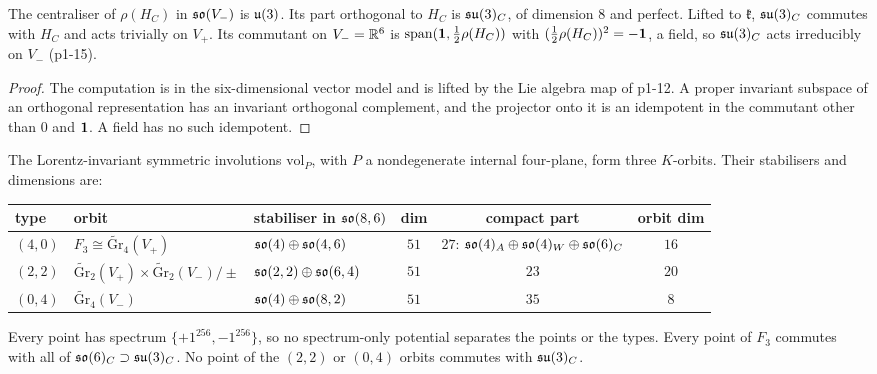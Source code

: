 \begin{lemma}
\label{p1:lem:colour}
The centraliser of $\rho(H_C)$ in $\mathfrak{so}(V_-)$ is $\mathfrak{u}(3)$. Its part orthogonal to $H_C$ is $\mathfrak{su}(3)_C$, of dimension $8$ and perfect. Lifted to $\mathfrak k$, $\mathfrak{su}(3)_C$ commutes
with $H_C$ and acts trivially on $V_+$. Its commutant on $V_-=\mathbb{R}^6$ is $\operatorname{span}(\mathbf 1,\tfrac12\rho(H_C))$ with $(\tfrac12\rho(H_C))^2=-\mathbf 1$, a field, so
$\mathfrak{su}(3)_C$ acts irreducibly on $V_-$ (p1-15).
\end{lemma}

\begin{proof}
The computation is in the six-dimensional vector model and is lifted by the Lie algebra map of p1-12. A proper invariant subspace of an orthogonal representation
has an invariant orthogonal complement, and the projector onto it is an idempotent in the commutant other than $0$ and $\mathbf 1$. A field has no such idempotent.
\end{proof}

\begin{theorem}
\label{p1:thm:classify}
The Lorentz-invariant symmetric involutions $\mathrm{vol}_P$, with $P$ a nondegenerate internal four-plane, form three $K$-orbits. Their stabilisers and dimensions are:
\begin{center}
\footnotesize
\begin{tabular}{@{}lllccc@{}}
\toprule
type & orbit & stabiliser in $\mathfrak{so}(8,6)$ & dim & compact part & orbit dim\\
\midrule
$(4,0)$ & $F_3\cong\widetilde{\mathrm{Gr}}_4(V_+)$ & $\mathfrak{so}(4)\oplus\mathfrak{so}(4,6)$ & $51$ & $27$: $\mathfrak{so}(4)_A\oplus\mathfrak{so}(4)_W\oplus\mathfrak{so}(6)_C$ & $16$\\
$(2,2)$ & $\widetilde{\mathrm{Gr}}_2(V_+)\times\widetilde{\mathrm{Gr}}_2(V_-)/\pm$ & $\mathfrak{so}(2,2)\oplus\mathfrak{so}(6,4)$ & $51$ & $23$ & $20$\\
$(0,4)$ & $\widetilde{\mathrm{Gr}}_4(V_-)$ & $\mathfrak{so}(4)\oplus\mathfrak{so}(8,2)$ & $51$ & $35$ & $8$\\
\bottomrule
\end{tabular}
\end{center}
Every point has spectrum $\{+1^{256},-1^{256}\}$, so no spectrum-only potential separates the points or the types. Every point of $F_3$ commutes with all of
$\mathfrak{so}(6)_C\supset\mathfrak{su}(3)_C$. No point of the $(2,2)$ or $(0,4)$ orbits commutes with $\mathfrak{su}(3)_C$.
\end{theorem}

